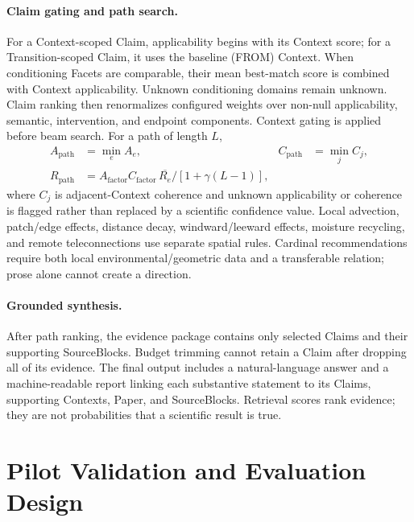 \documentclass{article}
\begin{document}
\paragraph{Claim gating and path search.}
For a Context-scoped Claim, applicability begins with its Context score; for a
Transition-scoped Claim, it uses the baseline (FROM) Context. When conditioning
Facets are comparable, their mean best-match score is combined with Context
applicability. Unknown conditioning domains remain unknown. Claim ranking then
renormalizes configured weights over non-null applicability, semantic,
intervention, and endpoint components. Context gating is applied before beam
search. For a path of length $L$,
\begin{align}
A_{\mathrm{path}}&=\min_e A_e, &
C_{\mathrm{path}}&=\min_j C_j,\\
R_{\mathrm{path}}&=A_{\mathrm{factor}}C_{\mathrm{factor}}
\,\overline{R_e}\big/\left[1+\gamma(L-1)\right],
\end{align}
where $C_j$ is adjacent-Context coherence and unknown applicability or
coherence is flagged rather than replaced by a scientific confidence value.
Local advection, patch/edge effects, distance decay, windward/leeward effects,
moisture recycling, and remote teleconnections use separate spatial rules.
Cardinal recommendations require both local environmental/geometric data and a
transferable relation; prose alone cannot create a direction.

\paragraph{Grounded synthesis.}
After path ranking, the evidence package contains only selected Claims and their
supporting SourceBlocks. Budget trimming cannot retain a Claim after dropping
all of its evidence. The final output includes a natural-language answer and a
machine-readable report linking each substantive statement to its Claims,
supporting Contexts, Paper, and SourceBlocks. Retrieval scores rank evidence;
they are not probabilities that a scientific result is true.

\section{Pilot Validation and Evaluation Design}
\end{document}

